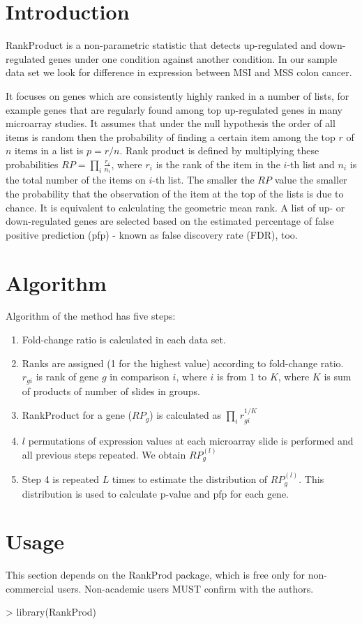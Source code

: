 \documentclass[a4paper]{report}
\begin{document}
\section*{Introduction}
RankProduct is a non-parametric statistic that detects up-regulated and down-regulated genes under one condition against another condition. In our sample data set we look for difference in expression between MSI and MSS colon cancer. \par
It focuses on genes which are consistently highly ranked in a number of lists, for example genes that are regularly found among top up-regulated genes in many microarray studies. It assumes that under the null hypothesis the order of all items is random then the probability of finding a certain item among the top $r$ of $n$ items in a list is $p=r/n$. Rank product is defined by multiplying these probabilities $RP=\prod_{i}\frac{r_i}{n_i}$, where $r_i$ is the rank of the item in the $i$-th list and $n_i$ is the total number of the items on $i$-th list. The smaller the $RP$ value the smaller the probability that the observation of the item at the top of the lists is due to chance. It is equivalent to calculating the geometric mean rank. A list of up- or down-regulated genes are selected based on the estimated percentage of false positive prediction (pfp) - known as false discovery rate (FDR), too.
\section*{Algorithm}
Algorithm of the method has five steps:
\begin{enumerate}
\item Fold-change ratio is calculated in each data set.
\item Ranks are assigned (1 for the highest value) according to fold-change ratio. $r_{gi}$ is rank of gene $g$ in comparison $i$, where $i$ is from $1$ to $K$, where $K$ is sum of products of number of slides in groups.
\item RankProduct for a gene ($RP_g$) is calculated as $\prod_{i}r_{gi}^{1/K}$
\item $l$ permutations of expression values at each microarray slide is performed and all previous steps repeated. We obtain $RP_g^{(l)}$
\item Step 4 is repeated $L$ times to estimate the distribution of $RP_g^{(l)}$. This distribution is used to calculate p-value and pfp for each gene.
\end{enumerate}
\section*{Usage}
This section depends on the {\ttfamily RankProd} package, which is free only for non-commercial users. Non-academic users MUST confirm with the authors. 
\begin{Schunk}
\begin{Sinput}
> library(RankProd)
\end{Sinput}
\end{Schunk}
\end{document}
